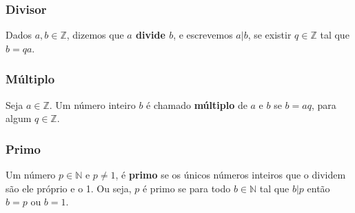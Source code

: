 \subsubsection*{Divisor}
Dados $a, b \in \mathbb{Z}$, dizemos que \textbf{$a$ divide $b$}, e escrevemos $a|b$, se existir $q \in \mathbb{Z}$ tal que $b = qa$.

\subsubsection*{Múltiplo}
Seja $a \in \mathbb{Z}$. Um número inteiro $b$ é chamado \textbf{múltiplo} de $a$ e $b$ se $b=aq$, para algum $q \in \mathbb{Z}$.

\subsubsection*{Primo}
Um número $p \in \mathbb{N}$ e $p \neq 1$, é \textbf{primo} se os únicos números inteiros que o dividem são ele próprio e o 1. Ou seja, $p$ é primo se para todo $b \in \mathbb{N}$ tal que $b|p$ então $b=p$ ou $b=1$.

